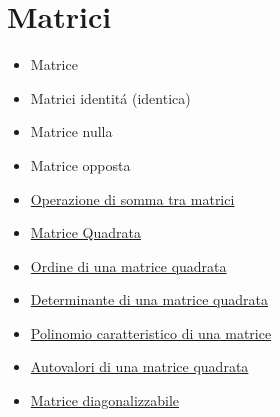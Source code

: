 \documentclass[a4paper,10pt]{article}
\begin{document}
\section{Matrici}
\begin{itemize}
   \item Matrice
   \item Matrici identit\'{a} (identica)
   \item Matrice nulla
   \item Matrice opposta
   \item \href{SommaMatrici.html}{Operazione di somma tra matrici}
   \item \href{MatriceQuadrata.html}{Matrice Quadrata}
   \item \href{OrdineMatrice.html}{Ordine di una matrice quadrata}
   \item \href{DeterminanteMatrice.html}{Determinante di una matrice quadrata}
   \item \href{PolinomioMatrice.html}{Polinomio caratteristico di una matrice}
   \item \href{AutovaloriMatrice.html}{Autovalori di una matrice quadrata}
   \item \href{MatriceDiagonalizzabile.html}{Matrice diagonalizzabile}
\end{itemize}
\end{document}

